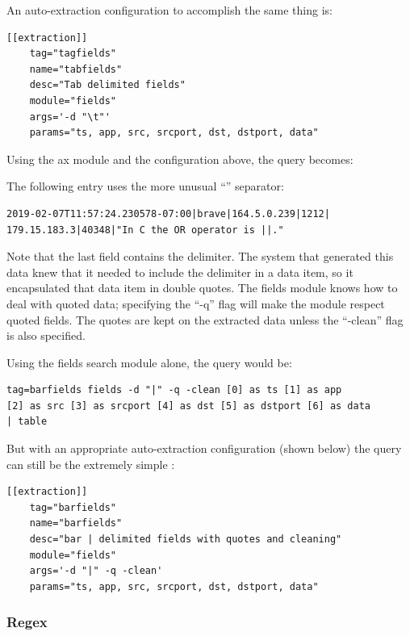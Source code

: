 An auto-extraction configuration to accomplish the same thing is:

\begin{Verbatim}[breaklines=true]
[[extraction]]
    tag="tagfields"
    name="tabfields"
    desc="Tab delimited fields"
    module="fields"
    args='-d "\t"'
    params="ts, app, src, srcport, dst, dstport, data"
\end{Verbatim}

Using the ax module and the configuration above, the query becomes:


The following entry uses the more unusual ``\textbar{}'' separator:

\begin{Verbatim}[breaklines=true]
2019-02-07T11:57:24.230578-07:00|brave|164.5.0.239|1212|
179.15.183.3|40348|"In C the OR operator is ||."
\end{Verbatim}

Note that the last field contains the delimiter. The system that
generated this data knew that it needed to include the delimiter in a
data item, so it encapsulated that data item in double quotes. The
fields module knows how to deal with quoted data; specifying the ``-q''
flag will make the module respect quoted fields. The quotes are kept on
the extracted data unless the ``-clean'' flag is also specified.

Using the fields search module alone, the query would be:

\begin{Verbatim}[breaklines=true]
tag=barfields fields -d "|" -q -clean [0] as ts [1] as app 
[2] as src [3] as srcport [4] as dst [5] as dstport [6] as data
| table
\end{Verbatim}

But with an appropriate auto-extraction configuration (shown below) the
query can still be the extremely simple :

\begin{Verbatim}[breaklines=true]
[[extraction]]
    tag="barfields"
    name="barfields"
    desc="bar | delimited fields with quotes and cleaning"
    module="fields"
    args='-d "|" -q -clean'
    params="ts, app, src, srcport, dst, dstport, data"
\end{Verbatim}

\subsubsection{Regex}

